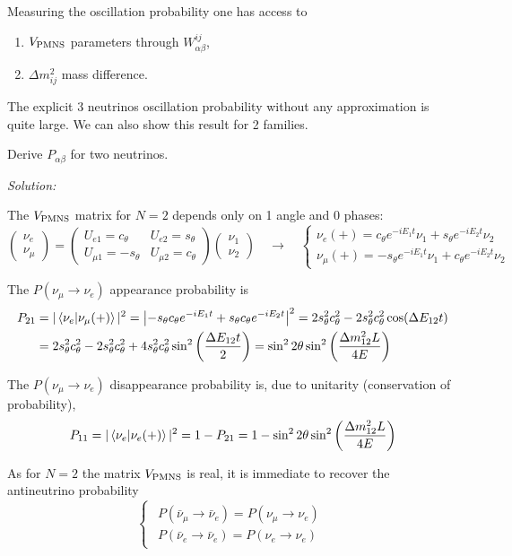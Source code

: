 \documentclass[TheoreticalPhy_ModB.tex]{subfiles}
\begin{document}
Measuring the oscillation probability one has access to 
\begin{enumerate}
	\item $V_{\text{PMNS}}$ parameters through $W_{\alpha\beta}^{ij}$,
	\item $\Delta m_{ij}^2$ mass difference.
\end{enumerate}
The explicit 3 neutrinos oscillation probability without any approximation is quite large. We can also show this result for 2 families. 

\begin{exercise}

Derive $P_{\alpha\beta}$ for two neutrinos.

\noindent
\textit{Solution:}

The $V_{\text{PMNS}}$ matrix for $N=2$ depends only on 1 angle and 0 phases:
\[\begin{pmatrix}\nu_e\\\nu_\mu\end{pmatrix}=\begin{pmatrix}U_{e1}=c_\theta&U_{e2}=s_\theta\\U_{\mu1}=-s_\theta&U_{\mu2}=c_\theta\end{pmatrix}\begin{pmatrix}\nu_1\\\nu_2\end{pmatrix}
\quad\rightarrow\quad
\begin{cases}\nu_e(+)=c_\theta e^{-iE_1t}\nu_1+s_\theta e^{-iE_2t}\nu_2\\
\nu_\mu(+)=-s_\theta e^{-iE_1t}\nu_1+c_\theta e^{-iE_2t}\nu_2\end{cases}\]

The $P(\nu_\mu\rightarrow\nu_e)$ appearance probability is 
\[\begin{aligned}
P_{21} &= \vert\braket{\nu_e}{\nu_\mu(+)}\vert^2
=\left\vert -s_\theta c_\theta e^{-iE_1t}+s_\theta c_\theta e^{-iE_2t}\right\vert^2
=2s_\theta^2 c_\theta^2-2s_\theta^2c_\theta^2\cos(\Delta E_{12}t)\\
&= 2s_\theta^2 c_\theta^2-2s_\theta^2 c_\theta^2+4s_\theta^2 c_\theta^2\sin^2\left(\frac{\Delta E_{12}t}2\right)
=\sin^22\theta\sin^2\left(\frac{\Delta m_{12}^2L}{4E}\right)
\end{aligned}\]

The $P(\nu_\mu\rightarrow\nu_e)$ disappearance probability is, due to unitarity (conservation of probability),
\[P_{11}=\vert\braket{\nu_e}{\nu_e(+)}\vert^2=1-P_{21}=1-\sin^22\theta\sin^2\left(\frac{\Delta m_{12}^2L}{4E}\right)\]

As for $N=2$ the matrix $V_{\text{PMNS}}$ is real, it is immediate to recover the antineutrino probability
\[\begin{cases}\begin{aligned}
P(\bar\nu_\mu\rightarrow\bar\nu_e)=P(\nu_\mu\rightarrow\nu_e)\\
P(\bar\nu_e\rightarrow\bar\nu_e)=P(\nu_e\rightarrow\nu_e)
\end{aligned}\end{cases}\]

\end{exercise}
\end{document}
